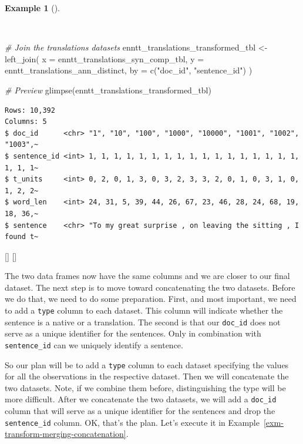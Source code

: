 \documentclass[
  letterpaper,
  krantz1]{latex/krantz-mod}
\newenvironment{Shaded}{\begin{snugshade}}{\end{snugshade}}
\newcommand{\AttributeTok}[1]{\textcolor[rgb]{0.00,0.00,0.00}{#1}}
\newcommand{\CommentTok}[1]{\textcolor[rgb]{0.00,0.00,0.00}{\textit{#1}}}
\newcommand{\FunctionTok}[1]{\textcolor[rgb]{0.00,0.00,0.00}{#1}}
\newcommand{\NormalTok}[1]{\textcolor[rgb]{0.00,0.00,0.00}{#1}}
\newcommand{\OtherTok}[1]{\textcolor[rgb]{0.00,0.00,0.00}{#1}}
\newcommand{\StringTok}[1]{\textcolor[rgb]{0.00,0.00,0.00}{#1}}
\newcommand{\cindex}[1]{%
  \StrSubstitute{#1}{_}{\_}[\temp]%
  \index{\temp}%
}
\theoremstyle{definition}
\theoremstyle{definition}
\newtheorem{example}{Example}[chapter]
\theoremstyle{remark}
\begin{document}
\begin{example}[]\protect\hypertarget{exm-transform-merging-join-left-syn-comp-translations}{}\label{exm-transform-merging-join-left-syn-comp-translations}

~

\begin{Shaded}
\begin{Highlighting}[numbers=left,,]
\CommentTok{\# Join the translations datasets}
\NormalTok{enntt\_translations\_transformed\_tbl }\OtherTok{\textless{}{-}}
  \FunctionTok{left\_join}\NormalTok{(}
    \AttributeTok{x =}\NormalTok{ enntt\_translations\_syn\_comp\_tbl,}
    \AttributeTok{y =}\NormalTok{ enntt\_translations\_ann\_distinct,}
    \AttributeTok{by =} \FunctionTok{c}\NormalTok{(}\StringTok{"doc\_id"}\NormalTok{, }\StringTok{"sentence\_id"}\NormalTok{)}
\NormalTok{  )}

\CommentTok{\# Preview}
\FunctionTok{glimpse}\NormalTok{(enntt\_translations\_transformed\_tbl)}
\end{Highlighting}
\end{Shaded}

\begin{verbatim}
Rows: 10,392
Columns: 5
$ doc_id      <chr> "1", "10", "100", "1000", "10000", "1001", "1002", "1003",~
$ sentence_id <int> 1, 1, 1, 1, 1, 1, 1, 1, 1, 1, 1, 1, 1, 1, 1, 1, 1, 1, 1, 1~
$ t_units     <int> 0, 2, 0, 1, 3, 0, 3, 2, 3, 3, 2, 0, 1, 0, 3, 1, 0, 1, 2, 2~
$ word_len    <int> 24, 31, 5, 39, 44, 26, 67, 23, 46, 28, 24, 68, 19, 18, 36,~
$ sentence    <chr> "To my great surprise , on leaving the sitting , I found t~
\end{verbatim}

\cindex{left_join()}\cindex{glimpse()}

\end{example}

The two data frames now have the same columns and we are closer to our
final dataset. The next step is to move toward concatenating the two
datasets. Before we do that, we need to do some preparation. First, and
most important, we need to add a \texttt{type} column to each dataset.
This column will indicate whether the sentence is a native or a
translation. The second is that our \texttt{doc\_id} does not serve as a
unique identifier for the sentences. Only in combination with
\texttt{sentence\_id} can we uniquely identify a sentence.

So our plan will be to add a \texttt{type} column to each dataset
specifying the values for all the observations in the respective
dataset. Then we will concatenate the two datasets. Note, if we combine
them before, distinguishing the type will be more difficult. After we
concatenate the two datasets, we will add a \texttt{doc\_id} column that
will serve as a unique identifier for the sentences and drop the
\texttt{sentence\_id} column. OK, that's the plan. Let's execute it in
Example~\ref{exm-transform-merging-concatenation}.
\end{document}
